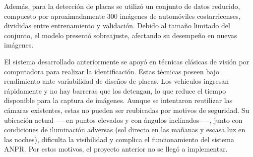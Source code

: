 Además, para la detección de placas se utilizó un conjunto de datos reducido,
compuesto por aproximadamente 300 imágenes de automóviles costarricenses,
divididas entre entrenamiento y validación. Debido al tamaño limitado del conjunto,
el modelo presentó sobreajuste, afectando su desempeño en nuevas imágenes.

El sistema desarrollado anteriormente se apoyó en técnicas clásicas de 
visión por computadora para realizar la identificación.
Estas técnicas poseen bajo rendimiento ante variabilidad de diseños de placas.
Los vehículos ingresan rápidamente y no hay barreras que los detengan,
lo que reduce el tiempo disponible para la captura de imágenes. 
Aunque se intentaron reutilizar las cámaras existentes, estas no pueden ser reubicadas por motivos de seguridad.
Su ubicación actual --—en puntos elevados y con ángulos inclinados—--,
junto con condiciones de iluminación adversas (sol directo en las mañanas y escasa luz en las noches),
dificulta la visibilidad y complica el funcionamiento del sistema ANPR.
Por estos motivos, el proyecto anterior no se llegó a implementar.

